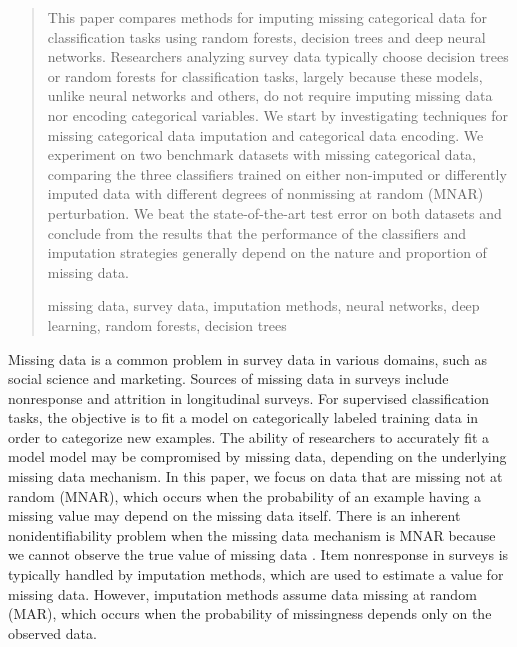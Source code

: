 \documentclass[10pt]{book}
\theoremstyle{definition}
\begin{document}
\begin{quotation}
This paper compares methods for imputing missing categorical data for classification
tasks using random forests, decision trees and deep neural networks.
Researchers analyzing survey data typically choose decision trees or random
forests for classification tasks, largely because these models, unlike neural
networks and others, do not require imputing missing data nor encoding categorical
variables. We start by investigating techniques for missing categorical data imputation
and categorical data encoding. We experiment on two benchmark datasets with missing categorical data, comparing the three classifiers trained on either non-imputed or differently imputed data with different degrees of nonmissing at random (MNAR) perturbation. We beat the state-of-the-art test error on both datasets and conclude from the results that the performance of the classifiers and imputation strategies generally depend on the nature and proportion of missing data. \par

\vspace{9pt}
missing data, survey data, imputation methods,  neural networks,  deep learning, random forests, decision trees
\par
\end{quotation}\par



\def\thefigure{\arabic{figure}}
\def\thetable{\arabic{table}}

\fontsize{12}{14pt plus.8pt minus .6pt}\selectfont

\newpage %

\setcounter{chapter}{1}
\setcounter{equation}{0} %

Missing data is a common problem in survey data in various domains, such as social science and marketing. Sources of missing data in surveys include nonresponse and attrition in longitudinal surveys. For supervised classification tasks, the objective is to fit a model on categorically labeled training data in order to categorize new examples. The ability of researchers to accurately fit a model model may be compromised by missing data, depending on the underlying missing data mechanism. In this paper, we focus on data that are missing not at random (MNAR), which occurs when the probability of an example having a missing value may depend on the missing data itself. There is an inherent nonidentifiability problem when the missing data mechanism is MNAR because we cannot observe the true value of missing data \citep{tsiatis2007}. Item nonresponse in surveys is typically handled by imputation methods, which are used to estimate a value for missing data. However, imputation methods assume data missing at random (MAR), which occurs when the probability of missingness depends only on the observed data. 
\end{document}
